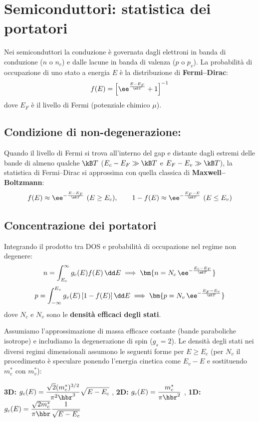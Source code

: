 \section{Semiconduttori: statistica dei portatori}

Nei semiconduttori la conduzione è governata dagli elettroni in banda di conduzione ($n$ o $n_c$) e dalle lacune in banda di valenza ($p$ o $p_v$). La probabilità di occupazione di uno stato a energia $E$ è la distribuzione di \textbf{Fermi--Dirac}:
\[ f(E) = \left[\ee^{\frac{E-E_F}{\kB T}}+1\right]^{-1} \]
dove $E_F$ è il livello di Fermi (potenziale chimico $\mu$).

\subsection*{Condizione di non-degenerazione:}
Quando il livello di Fermi si trova all'interno del gap e distante dagli estremi delle bande di almeno qualche $\kB T$ ($E_c-E_F\gg\kB T$ e $E_F-E_v\gg\kB T$), la statistica di Fermi--Dirac si approssima con quella classica di \textbf{Maxwell--Boltzmann}:
\[ f(E)\approx\ee^{-\frac{E-E_F}{\kB T}}\ (E\ge E_c), \qquad 1-f(E)\approx\ee^{-\frac{E_F-E}{\kB T}}\ (E\le E_v) \]

\subsection{Concentrazione dei portatori}
Integrando il prodotto tra DOS e probabilità di occupazione nel regime non degenere:
\[ n = \int_{E_c}^{\infty} g_c(E)f(E)\,\dd E \implies \bm{n = N_c\,\ee^{-\frac{E_c-E_F}{\kB T}}} \]
\[ p = \int_{-\infty}^{E_v} g_v(E)\left[1-f(E)\right]\dd E \implies \bm{p = N_v\,\ee^{-\frac{E_F-E_v}{\kB T}}} \]
dove $N_c$ e $N_v$ sono le \textbf{densità efficaci degli stati}.

\vspace{0.3cm}
Assumiamo l'approssimazione di massa efficace costante (bande paraboliche isotrope) e includiamo la degenerazione di spin ($g_s=2$). Le densità degli stati nei diversi regimi dimensionali assumono le seguenti forme per $E \ge E_c$ (per $N_v$ il procedimento è speculare ponendo l'energia cinetica come $E_v - E$ e sostituendo $m_c^*$ con $m_v^*$):

\textbf{3D:} $\displaystyle g_c(E) = \frac{\sqrt{2}(m_c^*)^{3/2}}{\pi^2\hbr^3}\sqrt{E-E_c}$   \qquad , \qquad 
 \textbf{2D:} $\displaystyle g_c(E) = \frac{m_c^*}{\pi\hbr^2}$  \qquad  , \qquad 
  \textbf{1D:} $\displaystyle g_c(E) = \frac{\sqrt{2m_c^*}}{\pi\hbr}\frac{1}{\sqrt{E-E_c}}$



